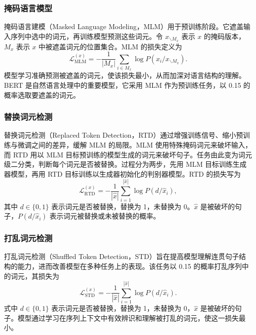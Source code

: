 \subsubsection{掩码语言模型}
掩码语言建模（Masked Language Modeling，MLM）用于预训练阶段。它遮盖输入序列中选中的词元，再训练模型预测这些词元。令 $x_{\backslash M_x}$ 表示 $x$ 的掩码版本，$M_x$ 表示 $x$ 中被遮盖词元的位置集合。MLM 的损失定义为
\begin{equation}
\mathcal{L}_{\mathrm{MLM}}^{(x)}=-\frac{1}{|M_x|}\sum_{i\in M_x}\log P(x_i/x_{\backslash M_x}).
\tag{2.22}
\end{equation}
模型学习准确预测被遮盖的词元，使该损失最小，从而加深对语言结构的理解。BERT 是自然语言处理中的重要模型，它采用 MLM 作为预训练任务，以 0.15 的概率选取要遮盖的词元。

\subsubsection{替换词元检测}
替换词元检测（Replaced Token Detection，RTD）通过增强训练信号、缩小预训练与微调之间的差异，缓解 MLM 的局限。MLM 使用特殊掩码词元来破坏输入，而 RTD 用以 MLM 目标预训练的模型生成的词元来破坏句子。任务由此变为词元级二分类，判断每个词元是否被替换。过程分为两步，先用 MLM 目标训练生成器模型，再用 RTD 目标训练以生成器初始化的判别器模型。RTD 的损失写为
\begin{equation}
\mathcal{L}_{\mathrm{RTD}}^{(x)}
=-\frac{1}{|\hat{x}|}\sum_{i=1}^{|\hat{x}|}\log P(d/\hat{x}_i),
\tag{2.23}
\end{equation}
其中 $d\in\{0,1\}$ 表示词元是否被替换，替换为 1，未替换为 0。$\hat{x}$ 是被破坏的句子，$P(d/\hat{x}_i)$ 表示词元被替换或未被替换的概率。

\subsubsection{打乱词元检测}
打乱词元检测（Shuffled Token Detection，STD）旨在提高模型理解连贯句子结构的能力，进而改善模型在多种任务上的表现。该任务以 0.15 的概率打乱序列中的词元，其损失为
\begin{equation}
\mathcal{L}_{\mathrm{STD}}^{(x)}
=-\frac{1}{|\hat{x}|}\sum_{i=1}^{|\hat{x}|}\log P(d/\hat{x}_i).
\tag{2.24}
\end{equation}
式中 $d\in\{0,1\}$ 表示词元是否被替换，替换为 1，未替换为 0，$\hat{x}$ 是被破坏的句子。模型通过学习在序列上下文中有效辨识和理解被打乱的词元，使这一损失最小。

